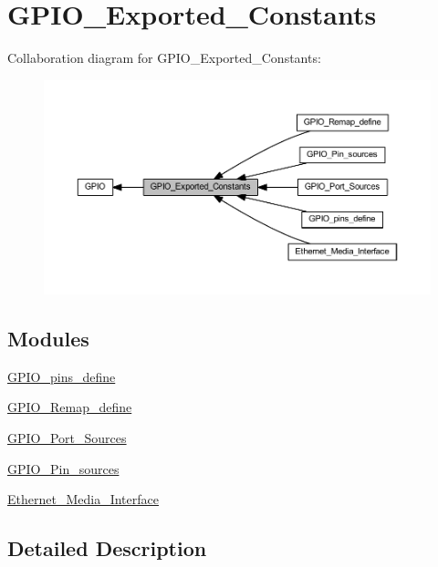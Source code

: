 \hypertarget{group___g_p_i_o___exported___constants}{}\section{G\+P\+I\+O\+\_\+\+Exported\+\_\+\+Constants}
\label{group___g_p_i_o___exported___constants}
Collaboration diagram for G\+P\+I\+O\+\_\+\+Exported\+\_\+\+Constants\+:
\nopagebreak
\begin{figure}[H]
\begin{center}
\leavevmode
\includegraphics[width=350pt]{group___g_p_i_o___exported___constants}
\end{center}
\end{figure}
\subsection*{Modules}
\begin{DoxyCompactItemize}
\item 
\hyperlink{group___g_p_i_o__pins__define}{G\+P\+I\+O\+\_\+pins\+\_\+define}
\item 
\hyperlink{group___g_p_i_o___remap__define}{G\+P\+I\+O\+\_\+\+Remap\+\_\+define}
\item 
\hyperlink{group___g_p_i_o___port___sources}{G\+P\+I\+O\+\_\+\+Port\+\_\+\+Sources}
\item 
\hyperlink{group___g_p_i_o___pin__sources}{G\+P\+I\+O\+\_\+\+Pin\+\_\+sources}
\item 
\hyperlink{group___ethernet___media___interface}{Ethernet\+\_\+\+Media\+\_\+\+Interface}
\end{DoxyCompactItemize}


\subsection{Detailed Description}
